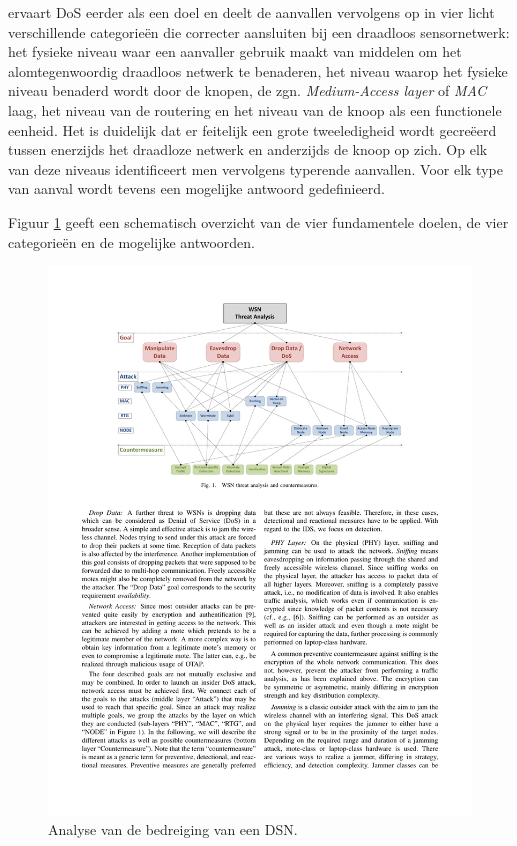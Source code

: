 \cite{aschenbruck2012security} ervaart DoS eerder als een doel en deelt de
aanvallen vervolgens op in vier licht verschillende categorie\"en die correcter
aansluiten bij een draadloos sensornetwerk: het fysieke niveau waar een
aanvaller gebruik maakt van middelen om het alomtegenwoordig draadloos netwerk
te benaderen, het niveau waarop het fysieke niveau benaderd wordt door de
knopen, de zgn. \emph{Medium-Access layer} of \emph{MAC} laag, het niveau van
de routering en het niveau van de knoop als een functionele eenheid. Het is
duidelijk dat er feitelijk een grote tweeledigheid wordt gecre\"eerd tussen
enerzijds het draadloze netwerk en anderzijds de knoop op zich. Op elk van deze
niveaus identificeert men vervolgens typerende aanvallen. Voor elk type van
aanval wordt tevens een mogelijke antwoord gedefinieerd.

Figuur \ref{fig:wsn-threat-analysis} geeft een schematisch overzicht van de
vier fundamentele doelen, de vier categorie\"en en de mogelijke antwoorden.

\begin{figure}[ht]
  \centering
  \includegraphics[width=0.9\linewidth]{resources/wsn-threat-analysis.pdf}
  \caption{Analyse van de bedreiging van een DSN.}
  \label{fig:wsn-threat-analysis}
\end{figure}

